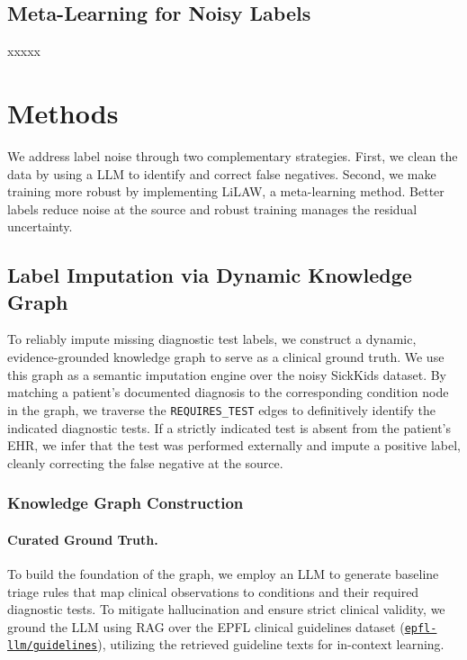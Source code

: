 \documentclass[pmlr]{jmlr}%
\begin{document}
\subsection*{Meta-Learning for Noisy Labels}
xxxxx


\section{Methods}

We address label noise through two complementary strategies. First, we clean the data by using a LLM to identify and correct false negatives. Second, we make training more robust by implementing LiLAW, a meta-learning method. Better labels reduce noise at the source and robust training manages the residual uncertainty.

\subsection{Label Imputation via Dynamic Knowledge Graph}
To reliably impute missing diagnostic test labels, we construct a dynamic, evidence-grounded knowledge graph to serve as a clinical ground truth. We use this graph as a semantic imputation engine over the noisy SickKids dataset. By matching a patient's documented diagnosis to the corresponding condition node in the graph, we traverse the \texttt{REQUIRES\_TEST} edges to definitively identify the indicated diagnostic tests. If a strictly indicated test is absent from the patient's EHR, we infer that the test was performed externally and impute a positive label, cleanly correcting the false negative at the source.

\subsubsection{Knowledge Graph Construction}

\paragraph{Curated Ground Truth.}
To build the foundation of the graph, we employ an LLM to generate baseline triage rules that map clinical observations to conditions and their required diagnostic tests. To mitigate hallucination and ensure strict clinical validity, we ground the LLM using RAG over the EPFL clinical guidelines dataset (\href{https://huggingface.co/datasets/epfl-llm/guidelines}{\texttt{epfl-llm/guidelines}}), utilizing the retrieved guideline texts for in-context learning.
\end{document}
